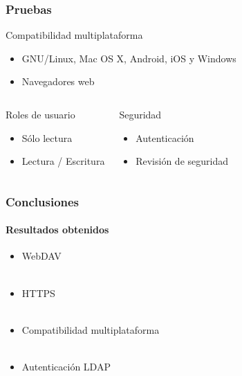 \documentclass{beamer}
\begin{document}
\begin{frame}
\frametitle{Pruebas}
\justifying

\begin{block}{Compatibilidad multiplataforma}
 \begin{itemize}
  \item GNU/Linux, Mac OS X, Android, iOS y Windows
  \item Navegadores web
 \end{itemize}
\end{block}

\begin{columns}[c] 

\begin{block}{Roles de usuario}
 \begin{itemize}
  \item S\'{o}lo lectura
  \item Lectura / Escritura
 \end{itemize}
\end{block}

\begin{block}{Seguridad}
 \begin{itemize}
  \item Autenticaci\'{o}n
  \item Revisi\'{o}n de seguridad
 \end{itemize}
\end{block}

\end{columns}

\end{frame}



\begin{frame}
\frametitle{Conclusiones}
\framesubtitle{Resultados obtenidos}
\justifying
\begin{itemize}
 \item WebDAV
\\~\\
 \item HTTPS
\\~\\
 \item Compatibilidad multiplataforma
\\~\\
 \item Autenticaci\'{o}n LDAP
\end{itemize}
\end{frame}
\end{document}
